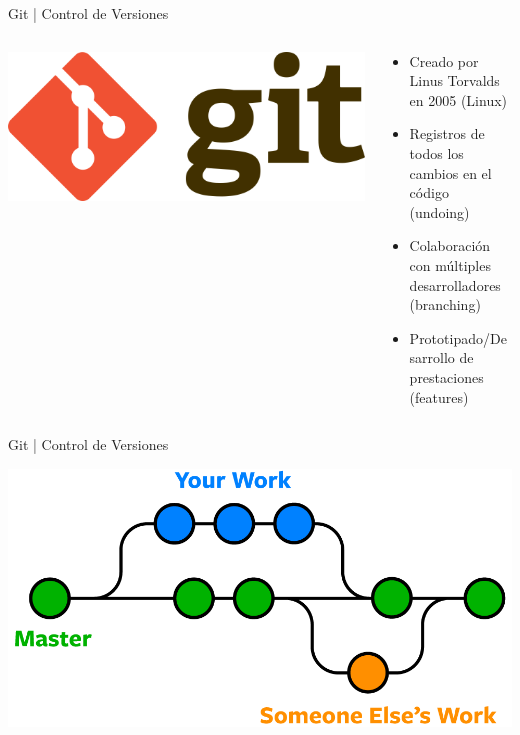 \documentclass{beamer}
\begin{document}
\begin{frame}{Git | Control de Versiones}
	\begin{columns}
		\begin{column}{.3\textwidth}
			\includegraphics[scale=.1]{img/git_logo.png}
		\end{column}
		\begin{column}{.6\textwidth}
			
			\begin{itemize}
				\item Creado por Linus Torvalds en 2005 (Linux)
				\item Registros de todos los cambios en el código (undoing)
				\item Colaboración con múltiples desarrolladores (branching)
				\item Prototipado/Desarrollo de prestaciones (features)
			\end{itemize}
		\end{column}
	\end{columns}
\end{frame}

\begin{frame}{Git | Control de Versiones}

	\includegraphics[scale=.3]{img/branches.png}
	
\end{frame}
\end{document}
